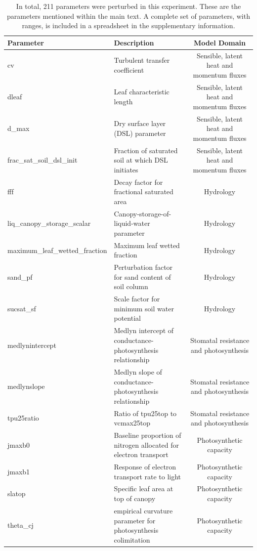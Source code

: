 \documentclass[draft]{agujournal2019}
\begin{document}
\begin{landscape}
 \begin{table}[h]
 \caption{In total, 211 parameters were perturbed in this experiment. These are the parameters mentioned within the main text. A complete set of parameters, with ranges, is included in a spreadsheet in the supplementary information.}
 \centering
 \begin{tabular}{l l c}
 \hline
  Parameter  & Description & Model Domain \\
 \hline
cv & Turbulent transfer coefficient & Sensible, latent heat and momentum fluxes \\
dleaf & Leaf characteristic length & Sensible, latent heat and momentum fluxes \\
d\_max & Dry surface layer (DSL) parameter & Sensible, latent heat and momentum fluxes \\
frac\_sat\_soil\_dsl\_init & Fraction of saturated soil at which DSL initiates & Sensible, latent heat and momentum fluxes \\
fff & Decay factor for fractional saturated area & Hydrology \\
liq\_canopy\_storage\_scalar & Canopy-storage-of-liquid-water parameter & Hydrology \\
maximum\_leaf\_wetted\_fraction & Maximum leaf wetted fraction & Hydrology \\
sand\_pf & Perturbation factor for sand content of soil column & Hydrology \\
sucsat\_sf & Scale factor for minimum soil water potential & Hydrology \\
medlynintercept & Medlyn intercept of conductance-photosynthesis relationship & Stomatal resistance and photosynthesis \\
medlynslope & Medlyn slope of conductance-photosynthesis relationship & Stomatal resistance and photosynthesis \\
tpu25ratio & Ratio of tpu25top to vcmax25top & Stomatal resistance and photosynthesis \\
jmaxb0 & Baseline proportion of nitrogen allocated for electron transport & Photosynthetic capacity\\
jmaxb1 & Response of electron transport rate to light & Photosynthetic capacity\\
slatop & Specific leaf area at top of canopy & Photosynthetic capacity\\
theta\_cj & empirical curvature parameter for photosynthesis colimitation& Photosynthetic capacity \\

\end{tabular}
\end{table}
\end{landscape}
\end{document}

